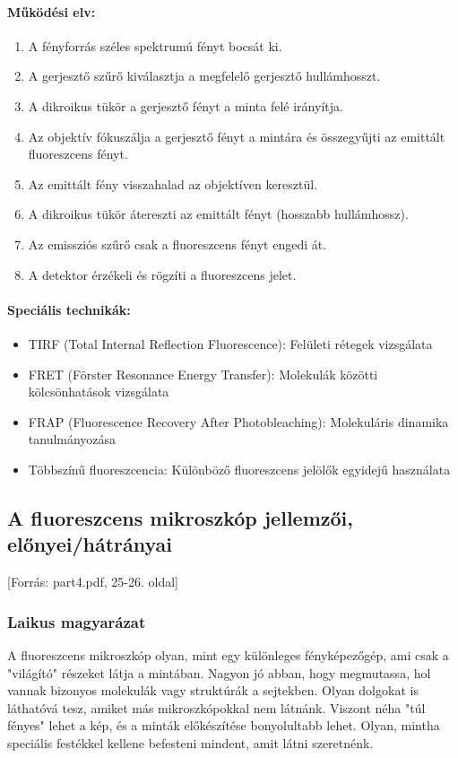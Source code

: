 \documentclass[a4paper,12pt]{article}
\begin{document}
\paragraph{Működési elv:} \begin{enumerate} \item A fényforrás széles spektrumú fényt bocsát ki. \item A gerjesztő szűrő kiválasztja a megfelelő gerjesztő hullámhosszt. \item A dikroikus tükör a gerjesztő fényt a minta felé irányítja. \item Az objektív fókuszálja a gerjesztő fényt a mintára és összegyűjti az emittált fluoreszcens fényt. \item Az emittált fény visszahalad az objektíven keresztül. \item A dikroikus tükör átereszti az emittált fényt (hosszabb hullámhossz). \item Az emissziós szűrő csak a fluoreszcens fényt engedi át. \item A detektor érzékeli és rögzíti a fluoreszcens jelet. \end{enumerate}

\paragraph{Speciális technikák:} \begin{itemize} \item TIRF (Total Internal Reflection Fluorescence): Felületi rétegek vizsgálata \item FRET (Förster Resonance Energy Transfer): Molekulák közötti kölcsönhatások vizsgálata \item FRAP (Fluorescence Recovery After Photobleaching): Molekuláris dinamika tanulmányozása \item Többszínű fluoreszcencia: Különböző fluoreszcens jelölők egyidejű használata \end{itemize}

\subsection{A fluoreszcens mikroszkóp jellemzői, előnyei/hátrányai} [Forrás: part4.pdf, 25-26. oldal]

\subsubsection{Laikus magyarázat} A fluoreszcens mikroszkóp olyan, mint egy különleges fényképezőgép, ami csak a "világító" részeket látja a mintában. Nagyon jó abban, hogy megmutassa, hol vannak bizonyos molekulák vagy struktúrák a sejtekben. Olyan dolgokat is láthatóvá tesz, amiket más mikroszkópokkal nem látnánk. Viszont néha "túl fényes" lehet a kép, és a minták előkészítése bonyolultabb lehet. Olyan, mintha speciális festékkel kellene befesteni mindent, amit látni szeretnénk.
\end{document}
